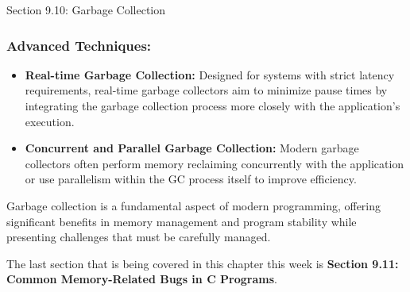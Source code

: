 \begin{notes}{Section 9.10: Garbage Collection}
    \subsubsection*{Advanced Techniques:}
    
    \begin{itemize}
        \item \textbf{Real-time Garbage Collection:} Designed for systems with strict latency requirements, real-time garbage collectors aim to minimize pause times by integrating the garbage collection 
        process more closely with the application's execution.
        \item \textbf{Concurrent and Parallel Garbage Collection:} Modern garbage collectors often perform memory reclaiming concurrently with the application or use parallelism within the GC process 
        itself to improve efficiency.
    \end{itemize}
    
    Garbage collection is a fundamental aspect of modern programming, offering significant benefits in memory management and program stability while presenting challenges that must be carefully managed.
\end{notes}

The last section that is being covered in this chapter this week is \textbf{Section 9.11: Common Memory-Related Bugs in C Programs}.

